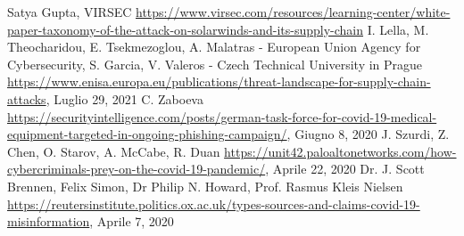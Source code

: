 \documentclass[12pt, a4paper]{article}
\begin{document}
\begin{thebibliography}{00}
 Satya Gupta, VIRSEC \url{https://www.virsec.com/resources/learning-center/white-paper-taxonomy-of-the-attack-on-solarwinds-and-its-supply-chain}
 I. Lella, M. Theocharidou, E. Tsekmezoglou, A. Malatras - European Union Agency for Cybersecurity, S. Garcia, V. Valeros - Czech Technical University in Prague \url{https://www.enisa.europa.eu/publications/threat-landscape-for-supply-chain-attacks}, Luglio 29, 2021
 C. Zaboeva  \url{https://securityintelligence.com/posts/german-task-force-for-covid-19-medical-equipment-targeted-in-ongoing-phishing-campaign/}, Giugno 8, 2020
 J. Szurdi, Z. Chen, O. Starov, A. McCabe, R. Duan \url{https://unit42.paloaltonetworks.com/how-cybercriminals-prey-on-the-covid-19-pandemic/}, Aprile 22, 2020
 Dr. J. Scott Brennen, Felix Simon, Dr Philip N. Howard, Prof. Rasmus Kleis Nielsen \url{https://reutersinstitute.politics.ox.ac.uk/types-sources-and-claims-covid-19-misinformation}, Aprile 7, 2020
\end{thebibliography}
\end{document}
